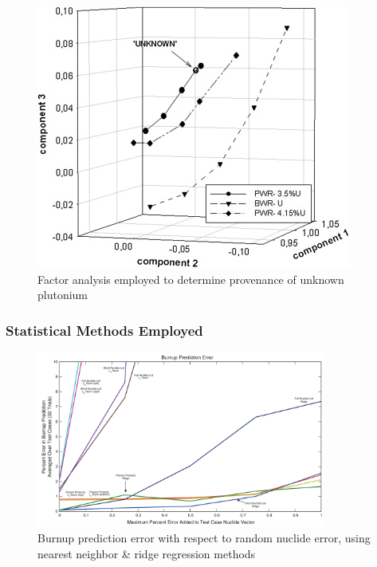 \begin{frame}
\begin{minipage}[t]{0.45\textwidth}
\begin{figure}
      \includegraphics[width=1\linewidth]{./figures/nicolaou.jpg}
      \caption{Factor analysis employed to determine provenance of unknown plutonium \cite{nicolaou_pu}}
    \end{figure}
  \end{minipage}
\end{frame}

\begin{frame}
  \frametitle{Statistical Methods Employed}
  \begin{figure}
    \centering
    \includegraphics[width=0.85\textwidth]{./figures/randomerror.png}
    \caption{Burnup prediction error with respect to random nuclide error, using nearest neighbor \& ridge regression methods \cite{dayman_feasibility_2013}}
  \end{figure}
\end{frame}
